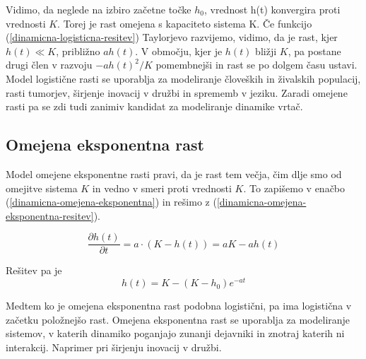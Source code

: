 \documentclass[a4paper, oneside, 12pt]{book}
\begin{document}
          Vidimo, da neglede na izbiro začetne točke $h_0$, vrednost h(t) konvergira proti vrednosti $K$. Torej je rast omejena s kapaciteto sistema K.
          Če funkcijo (\ref{dinamicna-logisticna-resitev}) Taylorjevo razvijemo, vidimo, da je rast, kjer $h(t) \ll K$, približno $a h(t)$. V območju, kjer je $h(t)$ bližji $K$, pa postane drugi člen v razvoju $-a h(t)^2 / K$ pomembnejši in rast se po dolgem času ustavi.
          Model logistične rasti se uporablja za modeliranje človeških in živalskih populacij, rasti tumorjev, širjenje inovacij v družbi in sprememb v jeziku. Zaradi omejene rasti pa se zdi tudi zanimiv kandidat za modeliranje dinamike vrtač.


          \subsection{Omejena eksponentna rast}

          Model omejene eksponentne rasti pravi, da je rast tem večja, čim dlje smo od omejitve sistema $K$ in vedno v smeri proti vrednosti $K$. To zapišemo v enačbo (\ref{dinamicna-omejena-eksponentna}) in rešimo z (\ref{dinamicna-omejena-eksponentna-resitev}).

          \begin{equation}
            \frac{\partial h(t)}{\partial t} = a \cdot ( K - h(t) ) = a K - a h(t)
            \label{dinamicna-omejena-eksponentna}
          \end{equation}

          Rešitev pa je
          \begin{equation}
            h(t) = K - (K - h_0) e^{-a t}
            \label{dinamicna-omejena-eksponentna-resitev}
          \end{equation}

            Medtem ko je omejena eksponentna rast podobna logistični, pa ima logistična v začetku položnejšo rast. Omejena eksponentna rast se uporablja za modeliranje sistemov, v katerih dinamiko poganjajo zunanji dejavniki in znotraj katerih ni interakcij. Naprimer pri širjenju inovacij v družbi.
\end{document}
